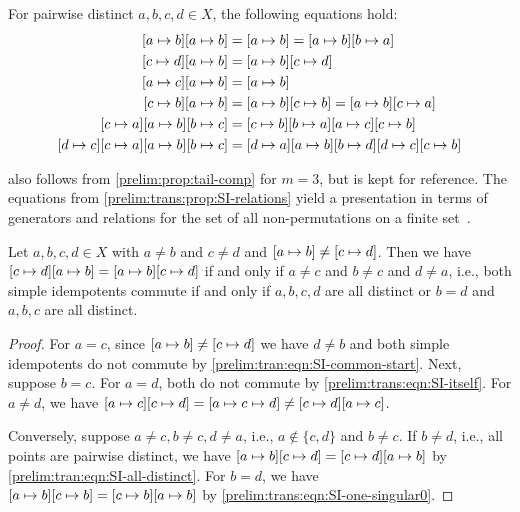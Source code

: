 \begin{proposition} \label{prelim:trans:prop:SI-relations}
	For pairwise distinct $a,b,c,d \in X$, the following equations hold:
	\begingroup
	\allowdisplaybreaks 
	\begin{align}
		\concat{\SI{a}{b}}{\SI{a}{b}} & = \SI{a}{b} = \concat{\SI{b}{a}}{\SI{a}{b}} \label{prelim:trans:eqn:SI-itself} \\
		\concat{\SI{a}{b}}{\SI{c}{d}} & = \concat{\SI{c}{d}}{\SI{a}{b}} \label{prelim:tran:eqn:SI-all-distinct} \\
		\concat{\SI{a}{b}}{\SI{a}{c}} & = \SI{a}{b} \label{prelim:tran:eqn:SI-common-start} \\
		\concat{\SI{a}{b}}{\SI{c}{b}} & = \concat{\SI{c}{b}}{\SI{a}{b}} = \concat{\SI{c}{a}}{\SI{a}{b}} \label{prelim:trans:eqn:SI-one-singular0} \\
		\concat{\SI{b}{c}}{\concat{\SI{a}{b}}{\SI{c}{a}}} & = \concat{\concat{\SI{c}{b}}{\SI{a}{c}}}{\concat{\SI{b}{a}}{\SI{c}{b}}} \\
		\concat{\SI{b}{c}}{\concat{\SI{a}{b}}{\concat{\SI{c}{a}}{\SI{d}{c}}}} & = 
		\concat{\SI{c}{b}}{\concat{\SI{d}{c}}{\concat{\SI{b}{d}}{\concat{\SI{a}{b}}{\SI{d}{a}}}}}
	\end{align}
	\endgroup%
\end{proposition}

 also follows from \cref{prelim:prop:tail-comp} for $m = 3$,
but is kept for reference.
The equations from \cref{prelim:trans:prop:SI-relations} yield a presentation
in terms of generators and relations for the set of all non-permutations on a finite set~\cite{East2013}.

\begin{corollary}
	Let $a,b,c,d \in X$ with $a \ne b$ and $c \ne d$ and $\SI{a}{b} \ne \SI{c}{d}$.
	Then
	we have 
	$\concat{\SI{a}{b}}{\SI{c}{d}} 
	= \concat{\SI{c}{d}}{\SI{a}{b}}$
	if and only if $a \ne c$ and $b \ne c$ and $d \ne a$, i.e., 
	both simple idempotents commute if and only if $a,b,c,d$ are all distinct
	or $b = d$ and $a,b,c$ are all distinct.
\end{corollary}
\begin{proof}
	For $a = c$, since $\SI{a}{b} \ne \SI{c}{d}$
	we have $d \ne b$
	and both simple idempotents
	do not commute by \cref{prelim:tran:eqn:SI-common-start}.
	Next, suppose $b = c$.
	For $a = d$,
	both do not commute by \cref{prelim:trans:eqn:SI-itself}.
	For $a \ne d$,
	we have $\concat{\SI{c}{d}}{\SI{a}{c}} = [a \mapsto c \mapsto d] \ne \concat{\SI{a}{c}}{\SI{c}{d}}$.
	
	Conversely, suppose $a \ne c, b \ne c, d \ne a$, i.e., $a \notin \{c,d\}$ and $b \ne c$.
	If $b \ne d$, i.e., all points are pairwise distinct,
	we have $\SI{a}{b}\SI{c}{d} = \SI{c}{d}\SI{a}{b}$ by \cref{prelim:tran:eqn:SI-all-distinct}.
	For $b = d$, we have $\SI{a}{b}\SI{c}{b} = \SI{c}{b}\SI{a}{b}$
	by \cref{prelim:trans:eqn:SI-one-singular0}.
\end{proof}

